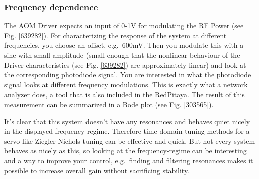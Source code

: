 \documentclass[10pt]{article}
\begin{document}
\subsubsection{Frequency dependence}\label{frequency-dependence}

The AOM Driver expects an input of 0-1V for modulating the RF Power (see
Fig. \ref{639282}). For characterizing the response of the system at
different frequencies, you choose an offset, e.g.~600mV. Then you
modulate this with a sine with small amplitude (small enough that the
nonlinear behaviour of the Driver characteristics (see Fig.
\ref{639282}) are approximately linear) and look at the corresponding
photodiode signal. You are interested in what the photodiode signal
looks at different frequency modulations. This is exactly what a network
analyzer does, a tool that is also included in the RedPitaya. The result
of this measurement can be summarized in a Bode plot (see Fig.
\ref{303565}).

It's clear that this system doesn't have any resonances and behaves
quiet nicely in the displayed frequency regime. Therefore time-domain
tuning methods for a servo like Ziegler-Nichols tuning can be effective
and quick. But not every system behaves as nicely as this, so looking at
the frequency-regime can be interesting and a way to improve your
control, e.g.~finding and filtering resonances makes it possible to
increase overall gain without sacrificing stability.

\FloatBarrier


\end{document}
